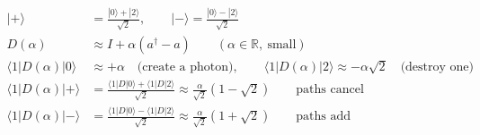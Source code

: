 \documentclass[12pt]{article}
\begin{document}
\fontsize{22}{28}\selectfont
\begin{align*}
|+\rangle &= \frac{|0\rangle+|2\rangle}{\sqrt{2}},
      \qquad
      |-\rangle = \frac{|0\rangle-|2\rangle}{\sqrt{2}} \\[0.40em]
D(\alpha) &\approx I + \alpha(a^\dagger - a)
      \qquad(\alpha\in\mathbb{R},\ \text{small}) \\[0.40em]
\langle 1|D(\alpha)|0\rangle &\approx +\alpha
      \quad\text{(create a photon)},
      \qquad
      \langle 1|D(\alpha)|2\rangle \approx -\alpha\sqrt{2}
      \quad\text{(destroy one)} \\[0.45em]
\langle 1|D(\alpha)|+\rangle
      &= \frac{\langle 1|D|0\rangle+\langle 1|D|2\rangle}{\sqrt{2}}
      \approx \frac{\alpha}{\sqrt{2}}(1-\sqrt{2})
      \qquad\text{paths cancel} \\[0.35em]
\langle 1|D(\alpha)|-\rangle
      &= \frac{\langle 1|D|0\rangle-\langle 1|D|2\rangle}{\sqrt{2}}
      \approx \frac{\alpha}{\sqrt{2}}(1+\sqrt{2})
      \qquad\text{paths add}
\end{align*}
\end{document}
